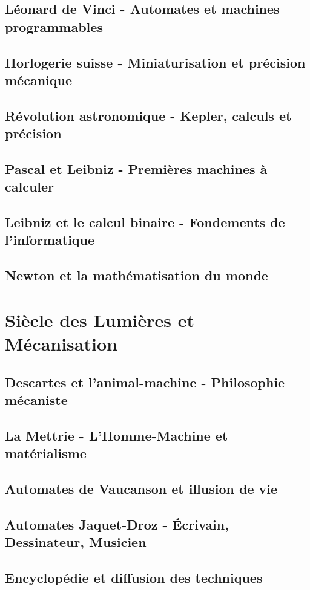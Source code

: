 \documentclass[12pt,a4paper]{book}
\begin{document}
\section{Léonard de Vinci - Automates et machines programmables}
\section{Horlogerie suisse - Miniaturisation et précision mécanique}
\section{Révolution astronomique - Kepler, calculs et précision}
\section{Pascal et Leibniz - Premières machines à calculer}
\section{Leibniz et le calcul binaire - Fondements de l'informatique}
\section{Newton et la mathématisation du monde}

\chapter{Siècle des Lumières et Mécanisation}
\section{Descartes et l'animal-machine - Philosophie mécaniste}
\section{La Mettrie - L'Homme-Machine et matérialisme}
\section{Automates de Vaucanson et illusion de vie}
\section{Automates Jaquet-Droz - Écrivain, Dessinateur, Musicien}
\section{Encyclopédie et diffusion des techniques}
\end{document}
